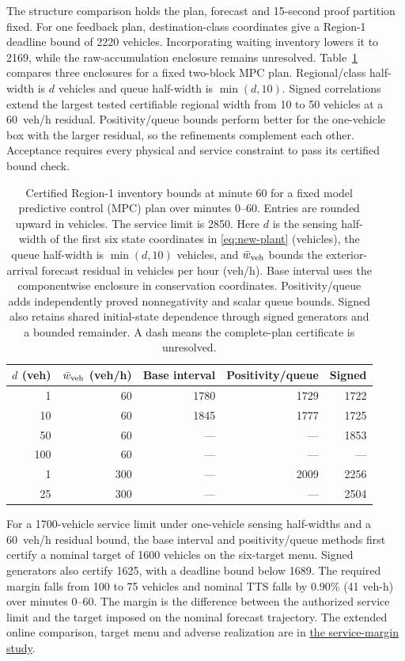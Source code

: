\documentclass[preprint,12pt]{elsarticle}
\newcommand{\reproductiondetails}[1]{\href{https://github.com/AlienEslami/agentic-perimeter-runtime-certification/blob/main/paper/supporting_materials/REPRODUCING_THE_REDUCED_PAPER.md}{#1}}
\begin{document}
The structure comparison holds the plan, forecast and 15-second proof
partition fixed. For one feedback plan, destination-class coordinates
give a Region-1 deadline bound of 2220 vehicles. Incorporating waiting
inventory lowers it to 2169, while the raw-accumulation enclosure remains
unresolved. Table~\ref{tab:structure-frontier} compares three enclosures
for a fixed two-block MPC plan. Regional/class half-width is $d$ vehicles
and queue half-width is $\min(d,10)$. Signed correlations extend the
largest tested certifiable regional width from 10 to 50 vehicles at a
60~veh/h residual. Positivity/queue bounds perform better for the
one-vehicle box with the larger residual, so the refinements complement
each other. Acceptance requires every physical and service constraint
to pass its certified bound check.

\begin{table}[t]
\centering\small
\caption{Certified Region-1 inventory bounds at minute 60 for a fixed
model predictive control (MPC) plan over minutes 0--60. Entries are rounded
upward in vehicles. The service limit is 2850. Here $d$ is the sensing
half-width of the first six state coordinates in \eqref{eq:new-plant}
(vehicles), the queue half-width is
$\min(d,10)$ vehicles, and $\bar w_{\rm veh}$ bounds the exterior-arrival
forecast residual in vehicles per hour (veh/h). Base interval uses the
componentwise enclosure in conservation coordinates. Positivity/queue adds
independently proved nonnegativity and scalar queue bounds. Signed also retains
shared initial-state dependence through signed generators and a bounded
remainder. A dash means the complete-plan certificate is unresolved.}
\label{tab:structure-frontier}
\setlength{\tabcolsep}{5pt}
\begin{tabular}{@{}rrrrr@{}}
\toprule
$d$ (veh) & $\bar w_{\rm veh}$ (veh/h) & Base interval & Positivity/queue & Signed\\
\midrule
1 & 60 & 1780 & 1729 & 1722\\
10 & 60 & 1845 & 1777 & 1725\\
50 & 60 & --- & --- & 1853\\
100 & 60 & --- & --- & ---\\
1 & 300 & --- & 2009 & 2256\\
25 & 300 & --- & --- & 2504\\
\bottomrule
\end{tabular}
\end{table}

For a 1700-vehicle service limit under one-vehicle sensing half-widths
and a 60~veh/h residual bound, the base interval and positivity/queue
methods first certify a nominal target of 1600 vehicles on the six-target
menu. Signed generators also certify 1625, with a deadline bound below
1689. The required margin falls from 100 to 75 vehicles and nominal TTS
falls by 0.90\% (41 veh-h) over minutes 0--60. The margin is
the difference between the authorized service limit and the target imposed
on the nominal forecast trajectory. The extended online comparison, target menu
and adverse realization are in \reproductiondetails{the service-margin study}.
\end{document}
